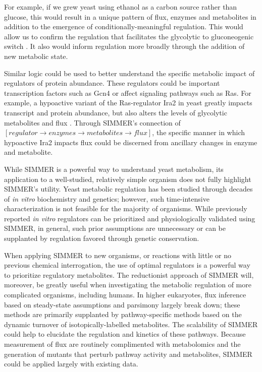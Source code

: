 For example, if we grew yeast using ethanol as a carbon source rather than glucose, this would result in a unique pattern of flux, enzymes and metabolites in addition to the emergence of conditionally-meaningful regulation. This would allow us to confirm the regulation that facilitates the glycolytic to gluconeogenic switch \cite{Zampar:2013fr}. It also would inform regulation more broadly through the addition of new metabolic state.

Similar logic could be used to better understand the specific metabolic impact of regulators of protein abundance. These regulators could be important transcription factors such as Gcn4 or affect signaling pathways such as Ras.  For example, a hypoactive variant of the Ras-regulator Ira2 in yeast greatly impacts transcript and protein abundance, but also alters the levels of glycolytic metabolites and flux \cite{Breunig:2014bu}. Through SIMMER's connection of $\left[regulator \rightarrow enzymes \rightarrow metabolites \rightarrow flux\right]$, the specific manner in which hypoactive Ira2 impacts flux could be discerned from ancillary changes in enzyme and metabolite. 

While SIMMER is a powerful way to understand yeast metabolism, its application to a well-studied, relatively simple organism does not fully highlight SIMMER's utility. Yeast metabolic regulation has been studied through decades of \textit{in vitro} biochemistry and genetics; however, such time-intensive characterization is not feasible for the majority of organisms. While previously reported \textit{in vitro} regulators can be prioritized and physiologically validated using SIMMER, in general, such prior assumptions are unnecessary or can be supplanted by regulation favored through genetic conservation.

When applying SIMMER to new organisms, or reactions with little or no previous chemical interrogation, the use of optimal regulators is a powerful way to prioritize regulatory metabolites. The reductionist approach of SIMMER will, moreover, be greatly useful when investigating the metabolic regulation of more complicated organisms, including humans. In higher eukaryotes, flux inference based on steady-state assumptions and parsimony largely break down; these methods are primarily supplanted by pathway-specific methods based on the dynamic turnover of isotopically-labelled metabolites. The scalability of SIMMER could help to elucidate the regulation and kinetics of these pathways. Because measurement of flux are routinely complimented with metabolomics and the generation of mutants that perturb pathway activity and metabolites, SIMMER could be applied largely with existing data.

